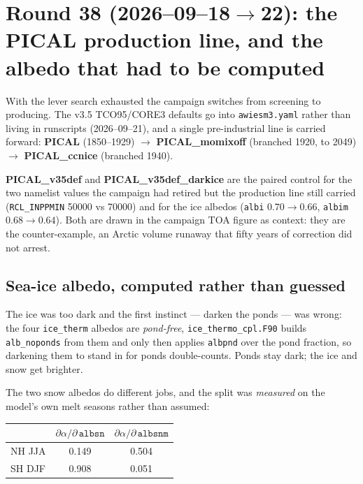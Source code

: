 \documentclass[10pt]{article}
\begin{document}
\section{Round 38 (2026--09--18$\to$22): the PICAL production line, and the albedo that had to be computed}\label{sec:round38}

With the lever search exhausted the campaign switches from screening to producing. The v3.5
TCO95/CORE3 defaults go into \texttt{awiesm3.yaml} rather than living in runscripts
(2026--09--21), and a single pre-industrial line is carried forward: \textbf{PICAL} (1850--1929)
$\to$ \textbf{PICAL\_momixoff} (branched 1920, to 2049) $\to$ \textbf{PICAL\_ccnice} (branched
1940).

\textbf{PICAL\_v35def} and \textbf{PICAL\_v35def\_darkice} are the paired control for the two
namelist values the campaign had retired but the production line still carried
(\texttt{RCL\_INPPMIN} 50000 vs 70000) and for the ice albedos (\texttt{albi} $0.70\to0.66$,
\texttt{albim} $0.68\to0.64$). Both are drawn in the campaign TOA figure as context: they are
the counter-example, an Arctic volume runaway that fifty years of correction did not arrest.

\subsection{Sea-ice albedo, computed rather than guessed}\label{sub:r38albedo}

The ice was too dark and the first instinct --- darken the ponds --- was wrong: the four
\texttt{ice\_therm} albedos are \emph{pond-free}, \texttt{ice\_thermo\_cpl.F90} builds
\texttt{alb\_noponds} from them and only then applies \texttt{albpnd} over the pond fraction, so
darkening them to stand in for ponds double-counts. Ponds stay dark; the ice and snow get
brighter.

The two snow albedos do different jobs, and the split was \emph{measured} on the model's own
melt seasons rather than assumed:

\begin{center}
\begin{tabular}{lcc}
\hline
 & $\partial\alpha/\partial\,\texttt{albsn}$ & $\partial\alpha/\partial\,\texttt{albsnm}$ \\
\hline
NH JJA & 0.149 & 0.504 \\
SH DJF & 0.908 & 0.051 \\
\hline
\end{tabular}
\end{center}
\end{document}
